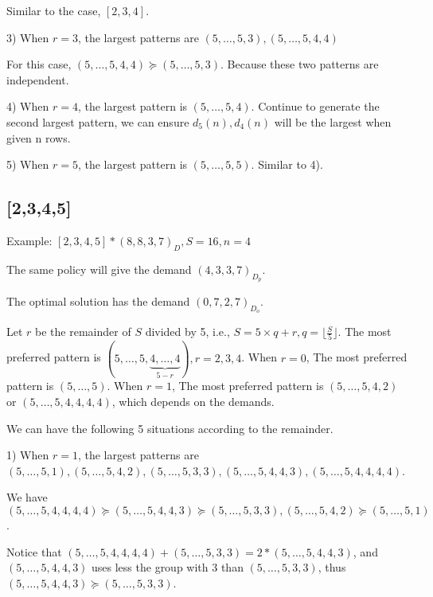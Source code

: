 Similar to the case, $[2,3,4]$.

3) When $r=3$, the largest patterns are $(5,\ldots,5,3), (5,\ldots,5,4,4)$

For this case, $(5,\ldots,5,4,4) \succeq (5,\ldots,5,3)$. Because these two patterns are independent.

4) When $r=4$, the largest pattern is $(5,\ldots,5,4)$. Continue to generate the second largest pattern, we can ensure $d_5(n), d_4(n)$ will be the largest when given n rows.

5) When $r=5$, the largest pattern is $(5,\ldots,5,5)$. Similar to 4).

\subsection{[2,3,4,5]}

Example:
$[2,3,4,5] * (8,8,3,7)_D, S = 16, n=4$

The same policy will give the demand $(4,3,3,7)_{D_p}$.

The optimal solution has the demand $(0,7,2,7)_{D_o}$.

\begin{thm}
  Let $r$ be the remainder of $S$ divided by 5, i.e., $S = 5 \times q +r, q = \lfloor \frac{S}{5} \rfloor$.
  The most preferred pattern is $(5,\ldots,5,\underbrace{4,\ldots,4}_{5-r}), r =2,3,4$. When $r=0$, The most preferred pattern is $(5,\ldots,5)$. When $r=1$, The most preferred pattern is $(5,\ldots,5,4,2)$ or $(5,\ldots,5,4,4,4,4)$, which depends on the demands.
\end{thm}

We can have the following 5 situations according to the remainder.

1) When $r = 1$, the largest patterns are $(5,\ldots,5,1), (5,\ldots,5,4,2),(5,\ldots,5,3,3), (5,\ldots,5,4,4,3), (5,\ldots,5,4,4,4,4)$.

We have $(5,\ldots,5,4,4,4,4) \succeq (5,\ldots,5,4,4,3) \succeq (5,\ldots,5,3,3), (5,\ldots,5,4,2) \succeq (5,\ldots,5,1)$.


Notice that $(5,\ldots,5,4,4,4,4) + (5,\ldots,5,3,3) = 2* (5,\ldots,5,4,4,3)$, and $(5,\ldots,5,4,4,3)$ uses less the group with 3 than $(5,\ldots,5,3,3)$, thus $(5,\ldots,5,4,4,3) \succeq (5,\ldots,5,3,3)$.

